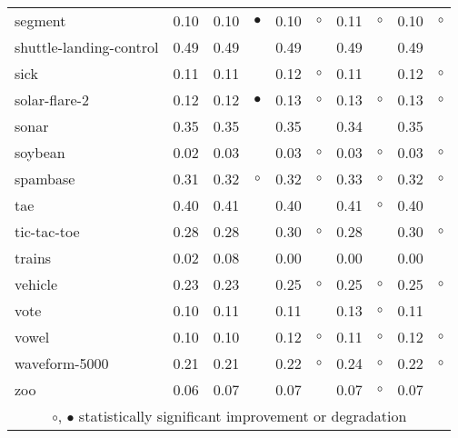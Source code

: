 {\begin{longtable}{lrr@{\hspace{0.1cm}}cr@{\hspace{0.1cm}}cr@{\hspace{0.1cm}}cr@{\hspace{0.1cm}}c}
segment & 0.10 & 0.10 & $\bullet$ & 0.10 &   $\circ$ & 0.11 &   $\circ$ & 0.10 &   $\circ$\\
shuttle-landing-control & 0.49 & 0.49 &           & 0.49 &           & 0.49 &           & 0.49 &          \\
sick & 0.11 & 0.11 &           & 0.12 &   $\circ$ & 0.11 &           & 0.12 &   $\circ$\\
solar-flare-2 & 0.12 & 0.12 & $\bullet$ & 0.13 &   $\circ$ & 0.13 &   $\circ$ & 0.13 &   $\circ$\\
sonar & 0.35 & 0.35 &           & 0.35 &           & 0.34 &           & 0.35 &          \\
soybean & 0.02 & 0.03 &           & 0.03 &   $\circ$ & 0.03 &   $\circ$ & 0.03 &   $\circ$\\
spambase & 0.31 & 0.32 &   $\circ$ & 0.32 &   $\circ$ & 0.33 &   $\circ$ & 0.32 &   $\circ$\\
tae & 0.40 & 0.41 &           & 0.40 &           & 0.41 &   $\circ$ & 0.40 &          \\
tic-tac-toe & 0.28 & 0.28 &           & 0.30 &   $\circ$ & 0.28 &           & 0.30 &   $\circ$\\
trains & 0.02 & 0.08 &           & 0.00 &           & 0.00 &           & 0.00 &          \\
vehicle & 0.23 & 0.23 &           & 0.25 &   $\circ$ & 0.25 &   $\circ$ & 0.25 &   $\circ$\\
vote & 0.10 & 0.11 &           & 0.11 &           & 0.13 &   $\circ$ & 0.11 &          \\
vowel & 0.10 & 0.10 &           & 0.12 &   $\circ$ & 0.11 &   $\circ$ & 0.12 &   $\circ$\\
waveform-5000 & 0.21 & 0.21 &           & 0.22 &   $\circ$ & 0.24 &   $\circ$ & 0.22 &   $\circ$\\
zoo & 0.06 & 0.07 &           & 0.07 &           & 0.07 &   $\circ$ & 0.07 &          \\
\hline
\multicolumn{10}{c}{$\circ$, $\bullet$ statistically significant improvement or degradation}\\
\end{longtable} \footnotesize \par}